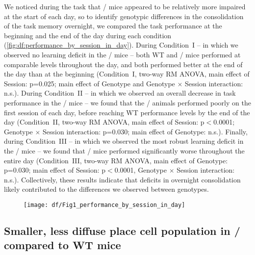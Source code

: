 We noticed during the task that \df/ mice appeared to be relatively more impaired at the start of each day, so to identify genotypic differences in the consolidation of the task memory overnight, we compared the task performance at the beginning and the end of the day during each condition (\autoref{fig:df:performance_by_session_in_day}). During Condition~I -- in which we observed no learning deficit in the \df/ mice -- both WT and \df/ mice performed at comparable levels throughout the day, and both performed better at the end of the day than at the beginning (Condition~I, two-way RM ANOVA, main effect of Session: p=0.025; main effect of Genotype and Genotype $\times$ Session interaction: n.s.). During Condition~II -- in which we observed an overall decrease in task performance in the \df/ mice --  we found that the \df/ animals performed poorly on the first session of each day, before reaching WT performance levels by the end of the day (Condition~II, two-way RM ANOVA, main effect of Session: p$<$0.0001; Genotype $\times$ Session interaction: p=0.030; main effect of Genotype: n.s.). Finally, during Condition~III -- in which we observed the most robust learning deficit in the \df/ mice -- we found that \df/ mice performed significantly worse throughout the entire day (Condition~III, two-way RM ANOVA, main effect of Genotype: p=0.030; main effect of Session: p$<$0.0001, Genotype $\times$ Session interaction: n.s.). Collectively, these results indicate that deficits in overnight consolidation likely contributed to the differences we observed between genotypes.
\begin{figure}
	\centering
	\texttt{[image: df/Fig1\_performance\_by\_session\_in\_day]}
	\caption{}
	\label{fig:df:performance_by_session_in_day}
\end{figure}

\subsection{Smaller, less diffuse place cell population in \df/ compared to WT mice}

